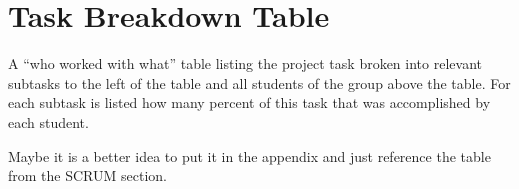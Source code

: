 \section{Task Breakdown Table \label{sec:tasks}}

A “who worked with what” table listing the project task broken into relevant subtasks to the left of the table and all students of the group above the table. For each subtask is listed how many percent of this task that was accomplished by each student.

Maybe it is a better idea to put it in the appendix and just reference the table from the SCRUM section.
